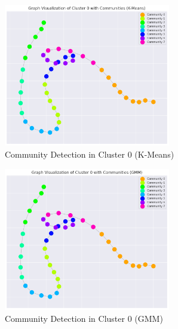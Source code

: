             \begin{figure}[H]
                \centering
                \begin{subfigure}[c]{0.47\textwidth}
                    \centering
                    \includegraphics[width=0.8\textwidth]{../figures/plots/section3/k-means_graph_visualization_of_cluster_0_with_communities.png}
                    \caption{Community Detection in Cluster 0 (K-Means)}
                    \label{fig:kmeans_graph}
                \end{subfigure}
                \hfill
                \begin{subfigure}[c]{0.47\textwidth}
                    \centering
                    \includegraphics[width=0.8\textwidth]{../figures/plots/section3/gmm_graph_visualization_of_cluster_0_with_communities.png}
                    \caption{Community Detection in Cluster 0 (GMM)}
                    \label{fig:gmm_graph}
                \end{subfigure}
                \vspace{-0.1cm}
                \caption{}
                \label{fig:}
            \end{figure}


